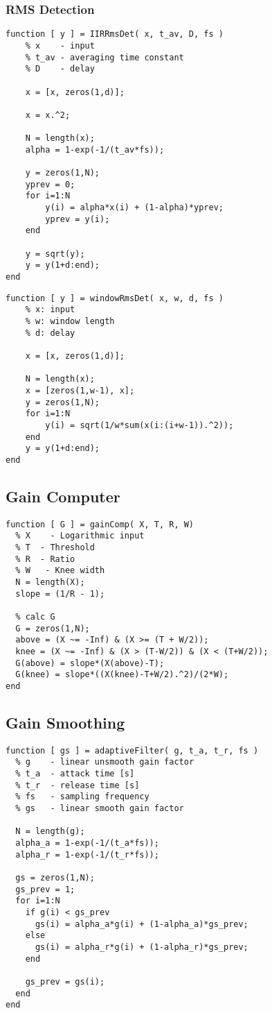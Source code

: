 \documentclass[../main2.tex]{subfiles}
\begin{document}
\subsubsection{RMS Detection}
\begin{lstlisting}[style=customc]
function [ y ] = IIRRmsDet( x, t_av, D, fs )
    % x    - input
    % t_av - averaging time constant
    % D    - delay
    
    x = [x, zeros(1,d)];

    x = x.^2;
   
    N = length(x);
    alpha = 1-exp(-1/(t_av*fs));
    
    y = zeros(1,N);
    yprev = 0;
    for i=1:N
        y(i) = alpha*x(i) + (1-alpha)*yprev;
        yprev = y(i);
    end
    
    y = sqrt(y);
    y = y(1+d:end);
end
\end{lstlisting}
\begin{lstlisting}[style=customc]
function [ y ] = windowRmsDet( x, w, d, fs )
    % x: input
    % w: window length
    % d: delay
    
    x = [x, zeros(1,d)];
    
    N = length(x);
    x = [zeros(1,w-1), x];
    y = zeros(1,N);
    for i=1:N
        y(i) = sqrt(1/w*sum(x(i:(i+w-1)).^2));
    end
    y = y(1+d:end);
end
\end{lstlisting}
\subsection{Gain Computer}
\begin{lstlisting}[style=customc]
function [ G ] = gainComp( X, T, R, W)
  % X    - Logarithmic input 
  % T  - Threshold
  % R  - Ratio
  % W   - Knee width
  N = length(X);
  slope = (1/R - 1);
    
  % calc G
  G = zeros(1,N);
  above = (X ~= -Inf) & (X >= (T + W/2));
  knee = (X ~= -Inf) & (X > (T-W/2)) & (X < (T+W/2));
  G(above) = slope*(X(above)-T);
  G(knee) = slope*((X(knee)-T+W/2).^2)/(2*W);
end
\end{lstlisting}


\subsection{Gain Smoothing}
\begin{lstlisting}[style=customc]
function [ gs ] = adaptiveFilter( g, t_a, t_r, fs )
  % g    - linear unsmooth gain factor
  % t_a  - attack time [s]
  % t_r  - release time [s]
  % fs   - sampling frequency
  % gs   - linear smooth gain factor

  N = length(g);
  alpha_a = 1-exp(-1/(t_a*fs));
  alpha_r = 1-exp(-1/(t_r*fs));
    
  gs = zeros(1,N);
  gs_prev = 1;
  for i=1:N
    if g(i) < gs_prev
      gs(i) = alpha_a*g(i) + (1-alpha_a)*gs_prev;
    else
      gs(i) = alpha_r*g(i) + (1-alpha_r)*gs_prev;
    end
        
    gs_prev = gs(i);
  end
end
\end{lstlisting}
\end{document}
